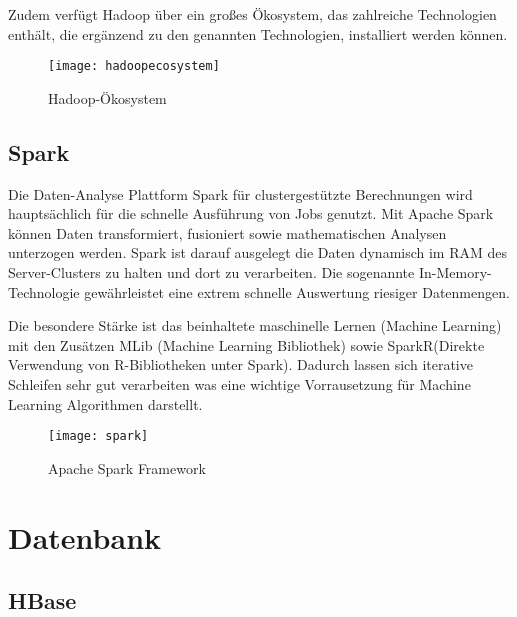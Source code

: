Zudem verfügt Hadoop über ein großes Ökosystem, das zahlreiche Technologien enthält, die ergänzend zu den genannten Technologien, installiert werden können.


\begin{figure}[!htb]
	\centering
	\texttt{[image: hadoopecosystem]}
	\caption{Hadoop-Ökosystem}
	\label{img:hadoopecosystem}
\end{figure}


\subsection{Spark}
\label{subsec:Spark}

Die Daten-Analyse Plattform Spark für clustergestützte Berechnungen wird hauptsächlich für die schnelle Ausführung von Jobs genutzt. Mit Apache Spark können Daten transformiert, fusioniert sowie mathematischen Analysen unterzogen werden. Spark ist darauf ausgelegt die Daten dynamisch im RAM des Server-Clusters zu halten und dort zu verarbeiten. Die sogenannte In-Memory-Technologie gewährleistet eine extrem schnelle Auswertung riesiger Datenmengen.

Die besondere Stärke ist das beinhaltete maschinelle Lernen (Machine Learning) mit den Zusätzen MLib (Machine Learning Bibliothek) sowie SparkR(Direkte Verwendung von R-Bibliotheken unter Spark). Dadurch lassen sich iterative Schleifen sehr gut verarbeiten was eine wichtige Vorrausetzung für Machine Learning Algorithmen darstellt.

\begin{figure}[!htb]
	\centering
	\texttt{[image: spark]}
	\caption{Apache Spark Framework}
	\label{img:sparkframework}
\end{figure}

\pagebreak

\section{Datenbank}
\label{sec:Datenbank}

\subsection{HBase}
\label{subsec:HBase}

